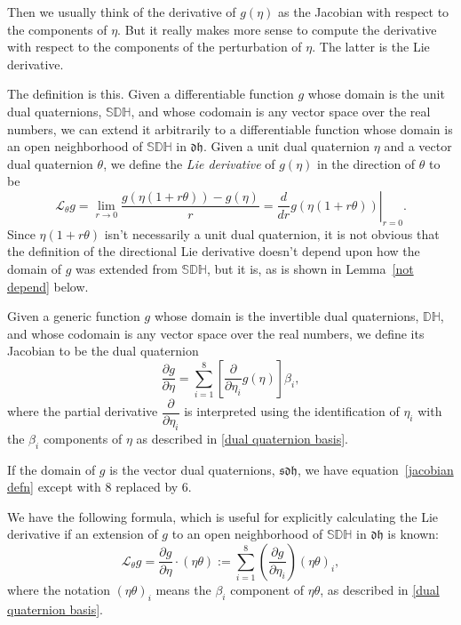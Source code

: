\documentclass[reqno,12pt]{amsart}
\newcommand\setinvertibledualquat{\mathbb D\mathbb H}
\newcommand\setdualquat{\mathfrak d \mathfrak h}
\newcommand\setunitdualquat{\mathbb S\mathbb D\mathbb H}
\newcommand\setvectordualquat{\mathfrak{s}\mathfrak d \mathfrak h}
\newcommand{\liederiv}{\mathcal L}
\begin{document}
Then we usually think of the derivative of $g(\eta)$ as the Jacobian with respect to the components of $\eta$.  But it really makes more sense to compute the derivative with respect to the components of the perturbation of $\eta$.  The latter is the Lie derivative.

The definition is this.  Given a differentiable function $g$ whose domain is the unit dual quaternions, $\setunitdualquat$, and whose codomain is any vector space over the real numbers, we can extend it arbitrarily to a differentiable function whose domain is an open neighborhood of $\setunitdualquat$ in $\setdualquat$.  Given a unit dual quaternion $\eta$ and a vector dual quaternion $\theta$, we define the \emph{Lie derivative} of $g(\eta)$ in the direction of $\theta$ to be
\begin{equation}
\label{lie diff defn}
\liederiv_\theta g = 
\lim_{r\to 0} \frac{g(\eta(1+r \theta)) - g(\eta)} r = 
\left. \frac{d}{d r} g(\eta(1+r\theta)) \right |_{r = 0}.
\end{equation}
Since $\eta(1+r\theta)$ isn't necessarily a unit dual quaternion, it is not obvious that the definition of the directional Lie derivative doesn't depend upon how the domain of $g$ was extended from $\setunitdualquat$, but it is, as is shown in Lemma~\ref{not depend} below.

Given a generic function $g$ whose domain is the invertible dual quaternions, $\setinvertibledualquat$, and whose codomain is any vector space over the real numbers, we define its Jacobian to be the dual quaternion
\begin{equation}
\label{jacobian defn}
\frac{\partial g}{\partial \eta} = \sum_{i=1}^8 \left[\frac{\partial}{\partial \eta_i} g(\eta) \right] \beta_i,
\end{equation}
where the partial derivative $\dfrac{\partial}{\partial \eta_i}$ is interpreted using the identification of $\eta_i$ with the $\beta_i$ components of $\eta$ as described in \eqref{dual quaternion basis}.

If the domain of $g$ is the vector dual quaternions, $\setvectordualquat$, we have equation~\eqref{jacobian defn} except with $8$ replaced by $6$.

We have the following formula, which is useful for explicitly calculating the Lie derivative if an extension of $g$ to an open neighborhood of $\setunitdualquat$ in $\setdualquat$ is known:
\begin{equation}
\label{lie diff defn 2}
\liederiv_\theta g = \frac{\partial g}{\partial \eta} \cdot (\eta \theta) := \sum_{i=1}^8 \left(\frac{\partial g}{\partial \eta_i}\right) (\eta \theta)_i ,
\end{equation}
where the notation $(\eta\theta)_i$ means the $\beta_i$ component of $\eta\theta$, as described in \eqref{dual quaternion basis}.
\end{document}
